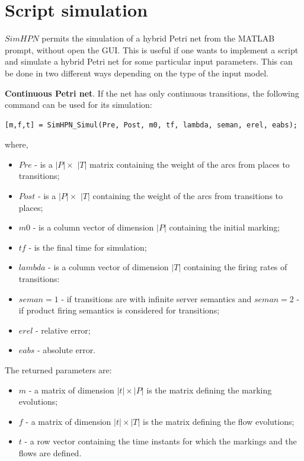 \section{Script simulation}
$SimHPN$ permits the simulation of a hybrid Petri net from the MATLAB prompt, without open the GUI. This is useful if one wants to implement a script and simulate a hybrid Petri net for some particular input parameters. This can be done in two different ways depending on the type of the input model.

\textbf{Continuous Petri net}. If the net has only continuous transitions, the following command can be used for its simulation:

\begin{verbatim}
[m,f,t] = SimHPN_Simul(Pre, Post, m0, tf, lambda, seman, erel, eabs);
\end{verbatim}
where, 
\begin{itemize}
\item $Pre$ - is a $|P| \times$ $|T|$ matrix containing the weight of the arcs from places to transitions;
\item $Post$ - is a $|P| \times$ $|T|$   containing the weight of the arcs from transitions to places;
\item $m0$ - is a column vector of dimension $|P|$ containing the initial marking;
\item $tf$ - is the final time for simulation;
\item $lambda$ - is a column vector of dimension $|T|$ containing the firing rates of transitions:
\item $seman = 1$ - if transitions are with infinite server semantics and $seman = 2$ - if product firing semantics is considered for transitions;
\item $erel$ - relative error;
\item $eabs$ - absolute error.
\end{itemize}

The returned parameters are:

\begin{itemize}
\item $m$ - a matrix of dimension $|t| \times |P|$ is the matrix defining the marking evolutions;
\item $f$ - a matrix of dimension $|t| \times |T|$ is the matrix defining the flow evolutions;
\item $t$ - a row vector containing the time instants for which the markings and the flows are defined.
\end{itemize}

